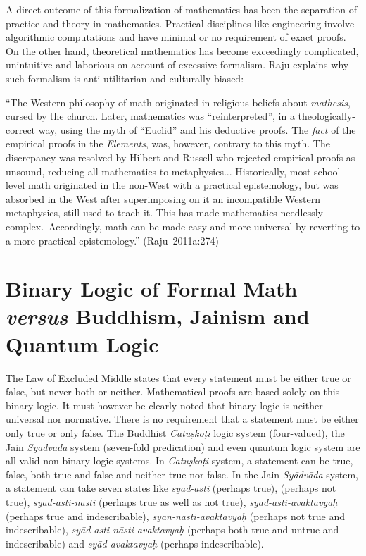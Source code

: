 A direct outcome of this formalization of mathematics has been the separation of practice and theory in mathematics. Practical disciplines like engineering involve algorithmic computations and have minimal or no requirement of exact proofs. On the other hand, theoretical mathematics has become exceedingly complicated, unintuitive and laborious on account of excessive formalism. Raju explains why such formalism is anti-utilitarian and culturally biased: 
\begin{myquote}
``The Western philosophy of math originated in religious beliefs about {\sl mathesis}, cursed by the church. Later, mathematics was ``reinterpreted'', in a theologically-correct way, using the myth of ``Euclid'' and his deductive proofs. The {\sl fact} of the empirical proofs in the {\sl Elements}, was, however, contrary to this myth. The discrepancy was resolved by Hilbert and Russell who rejected empirical proofs as unsound, reducing all mathematics to metaphysics... Historically, most school-level math originated in the non-West with a practical epistemology, but was absorbed in the West after superimposing on it an incompatible Western metaphysics, still used to teach it. This has made mathematics needlessly complex.~Accordingly, math can be made easy and more universal by reverting to a more practical epistemology.''
\hfill \hbox{(Raju 2011a:274)}
\end{myquote}

\section*{Binary Logic of Formal Math {\sl\bfseries versus} Buddhism, Jainism and Quantum Logic}

The Law of Excluded Middle states that every statement must be either true or false, but never both or neither. Mathematical proofs are based solely on this binary logic. It must however be clearly noted that binary logic is neither universal nor normative. There is no requirement that a statement must be either only true or only false. The Buddhist {\sl Catuṣkoṭi} logic system (four-valued), the Jain {\sl Syādvāda} system (seven-fold predication) and even quantum logic system are all valid non-binary logic systems. In {\sl Catuṣkoṭi} system, a statement can be true, false, both true and false and neither true nor false. In the Jain {\sl Syādvāda} system, a statement can take seven states like {\sl syād-asti} (perhaps true), (perhaps not true), {\sl syād-asti-nāsti} (perhaps true as well as not true), {\sl syād-asti-avaktavyaḥ} (perhaps true and indescribable), {\sl syān-nāsti-avaktavyaḥ} (perhaps not true and indescribable), {\sl syād-asti-nāsti-avaktavyaḥ} (perhaps both true and untrue and indescribable) and {\sl syād-avaktavyaḥ} (perhaps indescribable).

